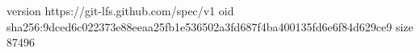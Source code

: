 version https://git-lfs.github.com/spec/v1
oid sha256:9dced6c022373e88eeaa25fb1e536502a3fd687f4ba400135fd6e6f84d629ce9
size 87496
